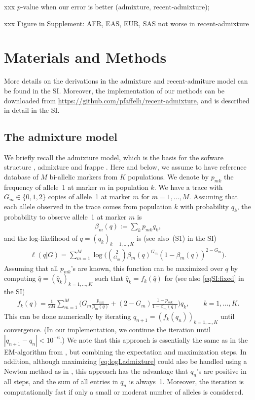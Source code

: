 \documentclass[12pt]{article}
\theoremstyle{definition}
\begin{document}
xxx $p$-value when our error is better (admixture, recent-admixture);

xxx Figure in Supplement: AFR, EAS, EUR, SAS not worse in
recent-admixture



\section{Materials and Methods}
\sloppy More details on the derivations in the admixture and
recent-admiture model can be found in the SI. Moreover, the
implementation of our methods can be downloaded from \url{
  https://github.com/pfaffelh/recent-admixture}, and is described in
detail in the SI.

\subsection{The admixture model}
We briefly recall the admixture model, which is the basis for the
sofware {\sc structure} \cite{Pritchard2000}, {\sc admixture}
\cite{Alexander2009} and {\sc frappe} \cite{Tang2005}.  Here and
below, we assume to have reference database of $M$ bi-allelic markers
from $K$ populations. We denote by $p_{mk}$ the frequency of allele~1
at marker $m$ in population $k$. We have a trace with
$G_m \in \{0,1,2\}$ copies of allele~1 at marker $m$ for
$m=1,...,M$. Assuming that each allele observed in the trace comes
from population $k$ with probability $q_k$, the probability to observe
allele~1 at marker $m$ is
\begin{align}
  \label{eq:beta}
  \beta_m(q) := \sum_k p_{mk} q_k,  
\end{align}
and the log-likelihood of $q = (q_k)_{k=1,...,K}$ is (see also~(S1) in
the SI)
\begin{align}\label{eq:logLadmixture}
  \ell(q|G) = \sum_{m=1}^M \log\Big(\binom{2}{G_m} \beta_m(q)^{G_m}(1-\beta_m(q))^{2-G_m}\Big).
\end{align}
Assuming that all $p_{mk}$'s are known, this function can be maximized
over $q$ by computing $\hat q = (\hat q_k)_{k=1,...,K}$ such that
$\hat q_k = f_k(\hat q)$ for (see also \eqref{eqSI:fixed} in the SI)
\begin{align}\label{eq:fixed}
  f_k(q) =
  \frac{1}{2M} \sum_{m=1}^M \Big(G_m \frac{p_{mk}}{\beta_m(q)} + (2-G_m)\frac{1-p_{mk}}{1-\beta_m(q)}\Big)q_k,
  \qquad k =1,...,K.
\end{align}
This can be done numerically by iterating
$q_{n+1} = (f_k(q_n))_{k=1,...,K}$ until convergence. (In our
implementation, we continue the iteration until
$|q_{n+1} - q_n|< 10^{-6}$.) We note that this approach is essentially
the same as in the EM-algorithm from \cite{Tang2005}, but combining
the expectation and maximization steps. In addition, although
maximizing \eqref{eq:logLadmixture} could also be handled using a
Newton method as in \cite{Alexander2006}, this approach has the
advantage that $q_n$'s are positive in all steps, and the sum of all
entries in $q_n$ is always~1. Moreover, the iteration is
computationally fast if only a small or moderat number of alleles is
considered.
\end{document}
